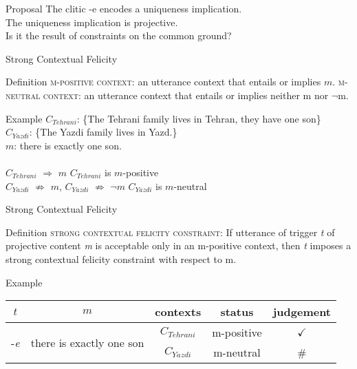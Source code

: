 \documentclass[10pt]{beamer}
\begin{document}
\begin {frame} {Proposal}
The clitic -{\color {red}e} encodes a uniqueness implication. \\ 
The uniqueness implication is projective. \\ \pause
Is it the result of constraints on the common ground?
\end {frame}


\begin {frame} {Strong Contextual Felicity}

\begin {block}{Definition}
\textsc{m-positive context}: an utterance context that entails or implies $m$.
\textsc{m-neutral context}: an utterance context that entails or implies neither m nor $\lnot$m.
\end {block} 

\begin {exampleblock} {Example}
$C_{Tehrani}$: \{The Tehrani family lives in Tehran, they have one son\}\\
$C_{Yazdi}$: \{The Yazdi family lives in Yazd.\}\\

$m$: there is exactly one son.\\
~\\
$C_{Tehrani}$ $\Rightarrow$ $m$ \hfill $C_{Tehrani}$ is $m$-positive\\
$C_{Yazdi}$ $\not \Rightarrow$ $m$, $C_{Yazdi}$ $\not \Rightarrow$ $\lnot m$ \hfill  $C_{Yazdi}$ is $m$-neutral
\end {exampleblock}

\end {frame}

\begin {frame}{Strong Contextual Felicity}

\begin {block} {Definition}
\textsc{strong contextual felicity constraint}: If utterance of trigger \emph{t} of projective content \emph{m} is acceptable only in an m-positive context, then \emph{t} imposes a strong contextual felicity constraint with respect to m.
\end {block}
\pause
\begin {exampleblock}{Example}
\begin {tabular}{c | c | c | c | c}
$t$ & $m$ & contexts & status & judgement \\ \hline
\multirow{2}{*}{-\emph{e}}& \multirow{2}{*}{there is exactly one son} & $C_{Tehrani}$ & m-positive & $\checkmark$ \\ 
& & $C_{Yazdi}$ & m-neutral & \# \\
\end {tabular}
\end {exampleblock}

\end {frame}
\end{document}
